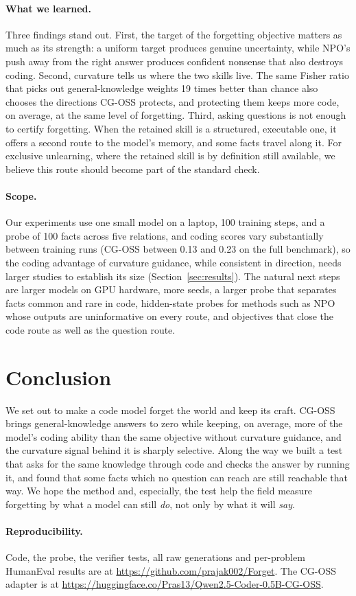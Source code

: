 \documentclass{article}
\begin{document}
\paragraph{What we learned.}
Three findings stand out. First, the target of the forgetting objective matters as much as its strength: a uniform target produces genuine uncertainty, while NPO's push away from the right answer produces confident nonsense that also destroys coding. Second, curvature tells us where the two skills live. The same Fisher ratio that picks out general-knowledge weights 19 times better than chance also chooses the directions CG-OSS protects, and protecting them keeps more code, on average, at the same level of forgetting. Third, asking questions is not enough to certify forgetting. When the retained skill is a structured, executable one, it offers a second route to the model's memory, and some facts travel along it. For exclusive unlearning, where the retained skill is by definition still available, we believe this route should become part of the standard check.
\paragraph{Scope.}
Our experiments use one small model on a laptop, 100 training steps, and a probe of 100 facts across five relations, and coding scores vary substantially between training runs (CG-OSS between 0.13 and 0.23 on the full benchmark), so the coding advantage of curvature guidance, while consistent in direction, needs larger studies to establish its size (Section~\ref{sec:results}). The natural next steps are larger models on GPU hardware, more seeds, a larger probe that separates facts common and rare in code, hidden-state probes for methods such as NPO whose outputs are uninformative on every route, and objectives that close the code route as well as the question route.

\section{Conclusion}
We set out to make a code model forget the world and keep its craft. CG-OSS brings general-knowledge answers to zero while keeping, on average, more of the model's coding ability than the same objective without curvature guidance, and the curvature signal behind it is sharply selective. Along the way we built a test that asks for the same knowledge through code and checks the answer by running it, and found that some facts which no question can reach are still reachable that way. We hope the method and, especially, the test help the field measure forgetting by what a model can still \emph{do}, not only by what it will \emph{say}.

\paragraph{Reproducibility.}
Code, the probe, the verifier tests, all raw generations and per-problem HumanEval results are at \url{https://github.com/prajak002/Forget}. The CG-OSS adapter is at \url{https://huggingface.co/Pras13/Qwen2.5-Coder-0.5B-CG-OSS}.



\end{document}
